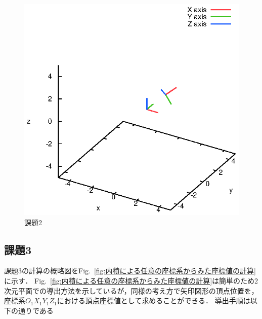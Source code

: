 \documentclass[a4paper,10pt]{jsarticle}
\begin{document}
\begin{figure}[b]
  \begin{center}
    \includegraphics[clip,width=14cm]{fig/eps/2.eps}
  \end{center}
  \caption{課題2}
  \label{fig:課題2}
\end{figure}

\subsection{課題3}
課題3の計算の概略図をFig.~\ref{fig:内積による任意の座標系からみた座標値の計算}に示す．
Fig.~\ref{fig:内積による任意の座標系からみた座標値の計算}は簡単のため2次元平面での導出方法を示しているが，同様の考え方で矢印図形の頂点位置を，座標系$O_1X_1Y_1Z_1$における頂点座標値として求めることができる．
導出手順は以下の通りである
\end{document}
